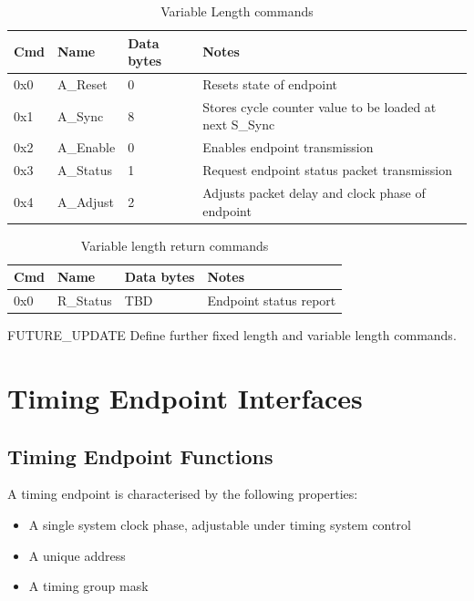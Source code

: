 \documentclass{dune}
\begin{document}
\begin{table}[h!]
  \centering
  \begin{tabular}{@{}lllp{9cm}@{}} \toprule
    Cmd & Name & Data bytes & Notes\\ \midrule
    0x0 & A\_Reset & 0 & Resets state of endpoint \\
    0x1 & A\_Sync & 8 & Stores cycle counter value to be loaded at next S\_Sync \\
    0x2 & A\_Enable & 0 & Enables endpoint transmission \\
    0x3 & A\_Status & 1 & Request endpoint status packet transmission \\ 
    0x4 & A\_Adjust & 2 & Adjusts packet delay and clock phase of endpoint \\ \bottomrule
  \end{tabular}
  \caption{Variable Length commands}
  \label{tab:async_cmds}
\end{table}

\begin{table}[h!]
  \centering
  \begin{tabular}{@{}lllp{9cm}@{}} \toprule
    Cmd & Name & Data bytes & Notes\\ \midrule
    0x0 & R\_Status & TBD & Endpoint status report \\ \bottomrule
  \end{tabular}
  \caption{Variable length return commands}
  \label{tab:async_ret_cmds}
\end{table}

{\color{red}FUTURE\_UPDATE} Define further fixed length and variable length commands.

\section{Timing Endpoint Interfaces}

\subsection{Timing Endpoint Functions}

A timing endpoint is characterised by the following properties:

\begin{itemize}
	\item A single system clock phase, adjustable under timing system control
	\item A unique address
	\item A timing group mask
\end{itemize}
\end{document}
